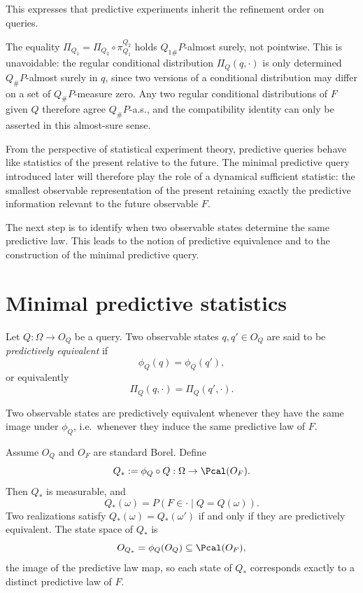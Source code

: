 This expresses that predictive experiments inherit the refinement order on queries.

\begin{remark}
The equality $\Pi_{Q_1} = \Pi_{Q_2}\circ\pi^{Q_2}_{Q_1}$ holds
$Q_{1\#}P$-almost surely, not pointwise.  This is unavoidable:
the regular conditional distribution $\Pi_Q(q,\cdot)$ is only
determined $Q_\#P$-almost surely in $q$, since two versions of a
conditional distribution may differ on a set of $Q_\#P$-measure
zero.  Any two regular conditional distributions of $F$ given $Q$
therefore agree $Q_\#P$-a.s., and the compatibility identity can
only be asserted in this almost-sure sense.
\end{remark}

\bigskip

\begin{remark}
From the perspective of statistical experiment theory, predictive
queries behave like statistics of the present relative to the future.
The minimal predictive query introduced later will therefore play the
role of a dynamical sufficient statistic: the smallest observable
representation of the present retaining exactly the predictive
information relevant to the future observable $F$.
\end{remark}

The next step is to identify when two observable states determine the
same predictive law.  This leads to the notion of predictive
equivalence and to the construction of the minimal predictive query.

\bigskip

\section{Minimal predictive statistics}\label{sec:minimal-predictive}

\begin{definition}\label{def:predictive-equivalence}
Let $Q:\Omega\to O_Q$ be a query.  Two observable states
$q,q'\in O_Q$ are said to be \emph{predictively equivalent} if
\[
\phi_Q(q)=\phi_Q(q'),
\]
or equivalently
\[
\Pi_Q(q,\cdot)=\Pi_Q(q',\cdot).
\]
\end{definition}

Two observable states are predictively equivalent whenever they have
the same image under $\phi_Q$, i.e.\ whenever they induce the same
predictive law of $F$.

\begin{theorem}\label{thm:minimal-predictive-query}
Assume $O_Q$ and $O_F$ are standard Borel.  Define
\[
Q_* := \phi_Q \circ Q : \Omega \to \Pcal(O_F).
\]
Then $Q_*$ is measurable, and
\[
Q_*(\omega) = P(F\in\cdot\mid Q=Q(\omega)).
\]
Two realizations satisfy $Q_*(\omega)=Q_*(\omega')$ if and only if
they are predictively equivalent.  The state space of $Q_*$ is
\[
O_{Q_*} = \phi_Q(O_Q) \subseteq \Pcal(O_F),
\]
the image of the predictive law map, so each state of $Q_*$
corresponds exactly to a distinct predictive law of $F$.
\end{theorem}

